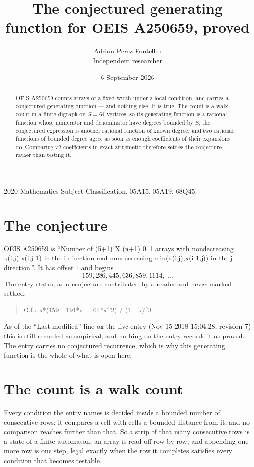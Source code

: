 \documentclass[11pt,a4paper]{article}
\title{The conjectured generating function for OEIS A250659, proved}
\author{Adrian Perez Fontelles\\ \small Independent researcher}
\date{6 September 2026}
\theoremstyle{plain}
\theoremstyle{definition}
\begin{document}
\maketitle

\begin{abstract}
OEIS A250659 counts arrays of a fixed width under a local condition, and carries a conjectured
generating function --- and nothing else. It is true. The count is a walk count in a finite
digraph on $S=64$ vertices, so its generating function is a rational function whose numerator
and denominator have degrees bounded by $S$; the conjectured expression is another rational
function of known degree; and two rational functions of bounded degree agree as soon as enough
coefficients of their expansions do. Comparing $72$ coefficients in exact arithmetic
therefore settles the conjecture, rather than testing it.
\end{abstract}

\noindent\small 2020 Mathematics Subject Classification. 05A15, 05A19, 68Q45.\normalsize

\section{The conjecture}

OEIS A250659 is ``Number of (5+1) X (n+1) 0..1 arrays with nondecreasing x(i,j)-x(i,j-1) in the i direction and nondecreasing min(x(i,j),x(i-1,j)) in the j direction.''. It has offset $1$ and begins
\[
159, 286, 445, 636, 859, 1114,\ \dots
\]
The entry states, as a conjecture contributed by a reader and never marked settled:
\begin{quote}
G.f.: x*(159 - 191*x + 64*x\^{}2) / (1 - x)\^{}3.
\end{quote}
As of the ``Last modified'' line on the live entry (Nov 15 2018 15:04:28, revision 7) this is still
recorded as empirical, and nothing on the entry records it as proved. The entry carries no
conjectured recurrence, which is why this generating function is the whole of what is open
here.

\section{The count is a walk count}

Every condition the entry names is decided inside a bounded number of consecutive rows: it
compares a cell with cells a bounded distance from it, and no comparison reaches further than
that. So a strip of that many consecutive rows is a state of a finite automaton, an array is
read off row by row, and appending one more row is one step, legal exactly when the row it
completes satisfies every condition that becomes testable.
\end{document}
